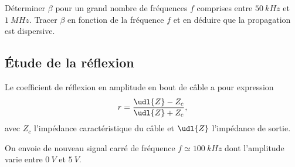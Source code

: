 
 \begin{protocole}
   \item
   Déterminer $\beta$ pour un grand nombre de fréquences $f$ comprises entre $\SI{50}{kHz}$ et $\SI{1}{MHz}$.
   Tracer $\beta$ en fonction de la fréquence $f$ et en déduire que la propagation est dispersive.
 \end{protocole}


 \subsection{Étude de la réflexion}

 Le coefficient de réflexion en amplitude en bout de câble a pour expression
 \begin{equation}
 \label{eq:r}
 r = \frac{\udl{Z} - Z_{\rm c}}{\udl{Z} + Z_{\rm c}},
 \end{equation}
 avec $Z_{c}$ l'impédance caractéristique du câble et $\udl{Z}$ l'impédance de sortie.



 On envoie de nouveau signal carré de fréquence $f \simeq \SI{100}{kHz}$ dont l’amplitude varie entre $\SI{0}{V}$ et $\SI{5}{V}$.

